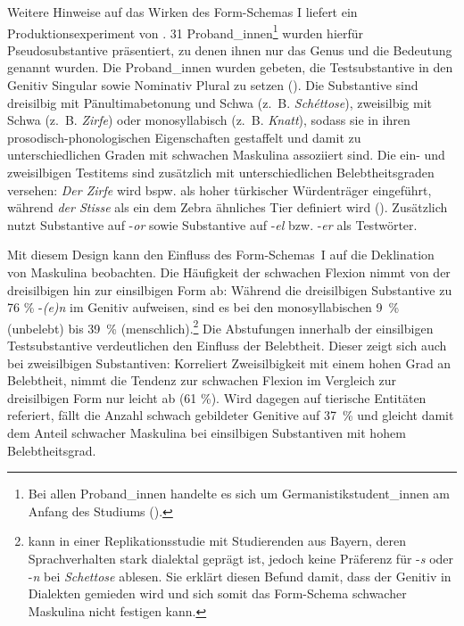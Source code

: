 Weitere Hinweise auf das Wirken des Form-Schemas I liefert ein Produktionsexperiment von \textcite{Kopcke.2000b}. 31 Proband\_innen\footnote{Bei allen Proband\_innen handelte es sich um Germanistikstudent\_innen am Anfang des Studiums (\cite[159]{Kopcke.2000b}).} wurden hierfür Pseudosubstantive präsentiert, zu denen ihnen nur das Genus und die Bedeutung genannt wurden. Die Proband\_innen wurden gebeten, die Testsubstantive in den Genitiv Singular sowie Nominativ Plural zu setzen (\cite[159]{Kopcke.2000b}). Die Substantive sind dreisilbig  mit Pänultimabetonung und Schwa (z.~B. \textit{Schéttose}), zweisilbig mit Schwa (z.~B. \textit{Zirfe}) oder monosyllabisch (z.~B. \textit{Knatt}), sodass sie in ihren prosodisch-phonologischen Eigenschaften gestaffelt und damit zu unterschiedlichen Graden mit schwachen Maskulina assoziiert sind. Die ein- und zweisilbigen Testitems  sind zusätzlich mit unterschiedlichen Belebtheitsgraden versehen: \textit{Der Zirfe} wird bspw. als hoher türkischer Würdenträger eingeführt, während \textit{der Stisse} als ein dem Zebra ähnliches Tier definiert wird (\cite[168]{Kopcke.2000b}). Zusätzlich nutzt \textcite{Kopcke.2000b} Substantive auf -\textit{or} sowie Substantive auf -\textit{el} bzw. -\textit{er} als Testwörter.\largerpage



Mit diesem Design kann \textcite[159--166]{Kopcke.2000b} den Einfluss des Form-Sche\-mas~I auf die Deklination von Maskulina beobachten. Die Häufigkeit der schwachen Flexion nimmt von der dreisilbigen hin zur einsilbigen Form ab: Während die dreisilbigen Substantive zu 76 \% -\textit{(e)n} im Genitiv aufweisen, sind es bei den monosyllabischen 9~\% (unbelebt) bis 39~\% (menschlich).\footnote{\textcite[416--418]{RonnebergerSibold.2020} kann in einer Replikationsstudie mit Studierenden aus Bayern, deren Sprachverhalten stark dialektal geprägt ist, jedoch keine Präferenz für -\textit{s} oder \mbox{-\textit{n}} bei \textit{Schettose} ablesen. Sie erklärt diesen Befund damit, dass der Genitiv in Dialekten gemieden wird und sich somit das Form-Schema schwacher Maskulina nicht festigen kann.} Die Abstufungen innerhalb der einsilbigen Testsubstantive verdeutlichen den Einfluss der Belebtheit. Dieser zeigt sich auch bei zweisilbigen Substantiven: Korreliert Zweisilbigkeit mit einem hohen Grad an Belebtheit, nimmt die Tendenz zur schwachen Flexion im Vergleich zur dreisilbigen Form nur leicht ab (61 \%). Wird dagegen auf tierische Entitäten referiert, fällt die Anzahl schwach gebildeter Genitive auf 37~\% und gleicht damit dem Anteil schwacher Maskulina bei einsilbigen Substantiven mit hohem Belebtheitsgrad.  



